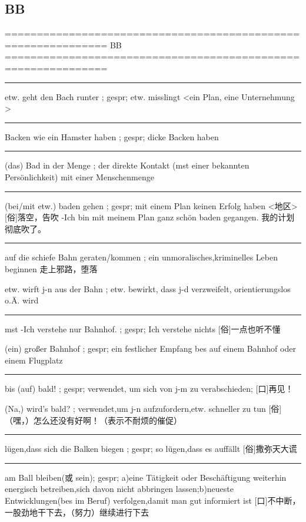 \subsection{BB}
\label{app:dict:BB}
\noindent============================================================== \newline
BB\\
============================================================== 

\noindent\rule{\textwidth}{1pt} 
etw. geht den Bach runter ; gespr; etw. misslingt \textless ein Plan, eine Unternehmung \textgreater

\noindent\rule{\textwidth}{1pt} 
Backen wie ein Hamster haben ; gespr; dicke Backen haben

\noindent\rule{\textwidth}{1pt} 
(das) Bad in der Menge ; der direkte Kontakt (mst einer bekannten Persönlichkeit) mit einer Menschenmenge

\noindent\rule{\textwidth}{1pt} 
(bei/mit etw.) baden gehen ; gespr; mit einem Plan keinen Erfolg haben
\textless 地区\textgreater [俗]落空，告吹
-Ich bin mit meinem Plan ganz schön baden gegangen. 我的计划彻底吹了。

\noindent\rule{\textwidth}{1pt} 
auf die schiefe Bahn geraten/kommen ; ein unmoralisches,kriminelles Leben beginnen
走上邪路，堕落

etw. wirft j-n aus der Bahn ; etw. bewirkt, dass j-d verzweifelt, orientierungslos o.Ä. wird

\noindent\rule{\textwidth}{1pt} 
mst -Ich verstehe nur Bahnhof. ; gespr; Ich verstehe nichts
[俗]一点也听不懂

(ein) großer Bahnhof ; gespr; ein festlicher Empfang bes auf einem Bahnhof oder einem Flugplatz

\noindent\rule{\textwidth}{1pt} 
bis (auf) bald! ; gespr; verwendet, um sich von j-m zu verabschieden;
[口]再见！

(Na,) wird's bald? ; verwendet,um j-n aufzufordern,etw. schneller zu tun
[俗]（嘿，）怎么还没有好啊！（表示不耐烦的催促）

\noindent\rule{\textwidth}{1pt} 
lügen,dass sich die Balken biegen ; gespr; so lügen,dass es auffällt
[俗]撒弥天大谎

\noindent\rule{\textwidth}{1pt} 
am Ball bleiben(或 sein); gespr; a)eine Tätigkeit oder Beschäftigung weiterhin energisch betreiben,sich davon nicht abbringen lassen;b)neueste Entwicklungen(bes im Beruf) verfolgen,damit man gut informiert ist
[口]不中断，一股劲地干下去，（努力）继续进行下去

